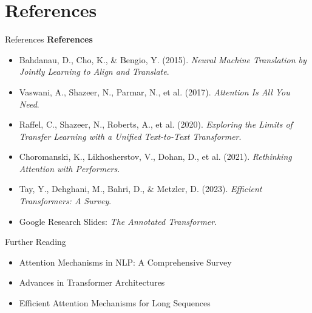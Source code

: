 \section{References}
\begin{frame}[allowframebreaks]{References}
    \textbf{References}
    \begin{itemize}
        \item Bahdanau, D., Cho, K., \& Bengio, Y. (2015). \textit{Neural Machine Translation by Jointly Learning to Align and Translate}.
        \item Vaswani, A., Shazeer, N., Parmar, N., et al. (2017). \textit{Attention Is All You Need}.
        \item Raffel, C., Shazeer, N., Roberts, A., et al. (2020). \textit{Exploring the Limits of Transfer Learning with a Unified Text-to-Text Transformer}.
        \item Choromanski, K., Likhosherstov, V., Dohan, D., et al. (2021). \textit{Rethinking Attention with Performers}.
        \item Tay, Y., Dehghani, M., Bahri, D., \& Metzler, D. (2023). \textit{Efficient Transformers: A Survey}.
        \item Google Research Slides: \textit{The Annotated Transformer}.
    \end{itemize}
    \begin{block}{Further Reading}
        \begin{itemize}
            \item Attention Mechanisms in NLP: A Comprehensive Survey
            \item Advances in Transformer Architectures
            \item Efficient Attention Mechanisms for Long Sequences
        \end{itemize}
    \end{block}
\end{frame}